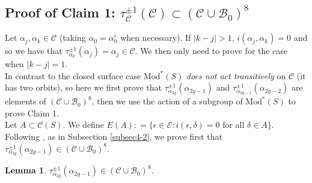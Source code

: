 \documentclass[twoside,11pt,a4paper]{article}
\newtheorem{Lema}[Def]{Lemma}
\newcommand*{\ccomp}[1]{\mathcal{C}(#1)}
\newcommand*{\EMod}[1]{\mathrm{Mod}^{*}(#1)}
\newcommand*{\Cf}{\mathscr{C}}
\newcommand*{\Bf}{\mathscr{B}}
\newcommand*{\Ef}{\mathscr{E}}
\newcommand*{\ColonEqq}{\mathrel{\mathop:}=}
\begin{document}
\subsection{Proof of Claim 1: $\tau_{\Cf}^{\pm 1}(\Cf) \subset (\Cf \cup \Bf_{0})^{8}$}\label{chap2sec4}
\indent Let $\alpha_{j}, \alpha_{k} \in \Cf$ (taking $\alpha_{0} = \alpha_{0}^{i}$ when necessary). If $|k -j| > 1$, $i(\alpha_{j},\alpha_{k}) = 0$ and so we have that $\tau_{\alpha_{k}}^{\pm 1}(\alpha_{j}) = \alpha_{j} \in \Cf$. We then only need to prove for the case when $|k-j| = 1$.\\
\indent In contrast to the closed surface case $\EMod{S}$ \emph{does not act transitively} on $\Cf$ (it has two orbits), so here we first prove that $\tau_{\alpha_{2g}}^{\pm 1}(\alpha_{2g-1})$ and $\tau_{\alpha_{2g-1}}^{\pm 1}(\alpha_{2g-2})$ are elements of $(\Cf \cup \Bf_{0})^{8}$, then we use the action of a subgroup of $\EMod{S}$ to prove Claim 1.\\
\indent Let $A \subset \ccomp{S}$. We define $E(A) \ColonEqq \{\epsilon \in \Ef : i(\epsilon,\delta) = 0$ for all $\delta \in A\}$.\\
\indent Following \cite{Ara2}, as in Subsection \ref{subsec4-2}, we prove first that $\tau^{\pm 1}_{\alpha_{2g}} (\alpha_{2g-1}) \in (\Cf \cup \Bf_{0})^{8}$.
\begin{Lema}\label{taupm1v1CUB0}
 $\tau^{\pm 1}_{\alpha_{2g}} (\alpha_{2g-1}) \in (\Cf \cup \Bf_{0})^{8}$.
\end{Lema}
\end{document}
